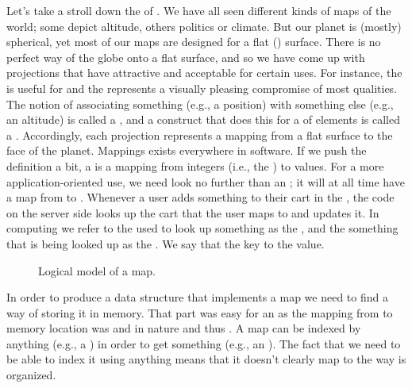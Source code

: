 Let's take a stroll down the  of . We have all seen different kinds of maps of the world; some depict altitude, others politics or climate. But our planet is (mostly) spherical, yet most of our maps are designed for a flat () surface. There is no perfect way of  the globe onto a flat surface, and so we have come up with projections that have attractive  and acceptable  for certain uses. For instance, the  is useful for  and the  represents a visually pleasing compromise of most qualities. The notion of associating something (e.g., a position) with something else (e.g., an altitude) is called a , and a construct that does this for a  of elements is called a . Accordingly, each projection represents a mapping from a flat surface to the face of the planet. Mappings exists everywhere in software. If we push the definition a bit, a  is a mapping from integers (i.e., the ) to  values. For a more application-oriented use, we need look no further than an ; it will at all time have a map from  to . Whenever a user adds something to their cart in the , the code on the server side looks up the cart that the user maps to and updates it. In computing we refer to the  used to look up something as the , and the something that is being looked up as the . We say that the key  to the value.

\begin{figure}[tbp]
  
  \caption{Logical model of a map.}
  \label{fig:collections:map}
\end{figure}

In order to produce a data structure that implements a map we need to find a way of storing it in memory. That part was easy for an  as the mapping from  to memory location was  and  in nature and thus . A map can be indexed by anything (e.g., a ) in order to get something (e.g., an ). The fact that we need to be able to index it using anything means that it doesn't clearly map to the way  is organized.

